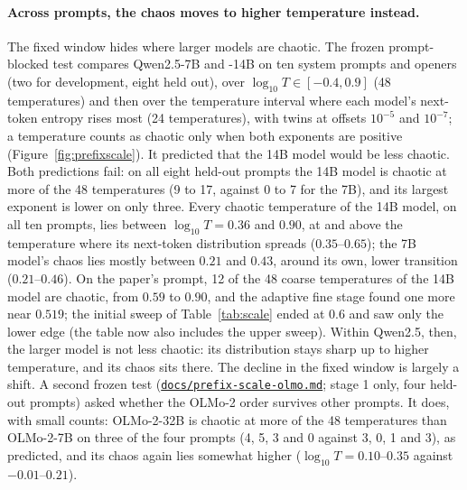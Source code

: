 \documentclass[11pt,letterpaper]{article}
\newcommand{\repourl}{https://github.com/tdj28/neural-shrimp}
\newcommand{\reporef}{arxiv-v1}
\newcommand{\repo}[1]{\href{\repourl/blob/\reporef/#1}{\nolinkurl{#1}}}
\begin{document}
\paragraph{Across prompts, the chaos moves to higher temperature instead.} The fixed window hides where larger models
are chaotic. The frozen prompt-blocked test compares Qwen2.5-7B and -14B on ten system prompts and openers (two for
development, eight held out), over $\log_{10}T\in[-0.4,0.9]$ (48 temperatures) and then over the temperature interval
where each model's next-token entropy rises most (24 temperatures), with twins at offsets $10^{-5}$ and $10^{-7}$; a
temperature counts as chaotic only when both exponents are positive (Figure~\ref{fig:prefixscale}). It predicted that
the 14B model would be less chaotic. Both predictions fail: on all eight held-out prompts the 14B model is chaotic at
more of the 48 temperatures (9 to 17, against 0 to 7 for the 7B), and its largest exponent is lower on only three.
Every chaotic temperature of the 14B model, on all ten prompts, lies between $\log_{10}T=0.36$ and $0.90$, at and
above the temperature where its next-token distribution spreads ($0.35$--$0.65$); the 7B model's chaos lies mostly
between $0.21$ and $0.43$, around its own, lower transition ($0.21$--$0.46$). On the paper's prompt, 12 of the 48
coarse temperatures of the 14B model are chaotic, from $0.59$ to $0.90$, and the adaptive fine stage found one more
near $0.519$; the initial sweep of Table~\ref{tab:scale} ended at $0.6$ and saw only the lower edge (the table now
also includes the upper sweep). Within Qwen2.5, then, the larger model is not less chaotic: its distribution stays
sharp up to higher temperature, and its chaos sits there. The decline in the fixed window is largely a shift. A
second frozen test (\repo{docs/prefix-scale-olmo.md}; stage 1 only, four held-out prompts) asked whether the OLMo-2
order survives other prompts. It does, with small counts: OLMo-2-32B is chaotic at more of the 48 temperatures than
OLMo-2-7B on three of the four prompts (4, 5, 3 and 0 against 3, 0, 1 and 3), as predicted, and its chaos again lies
somewhat higher ($\log_{10}T=0.10$--$0.35$ against $-0.01$--$0.21$).
\end{document}
